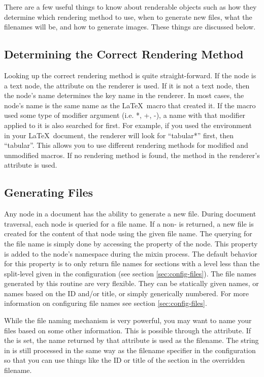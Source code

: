There are a few useful things to know about renderable objects such as
how they determine which rendering method to use, when to generate new
files, what the filenames will be, and how to generate images.  These
things are discussed below.


\subsection{Determining the Correct Rendering Method}

Looking up the correct rendering method is quite straight-forward.
If the node is a text node, the  attribute on
the renderer is used.  If it is not a text node, then the node's name
determines the key name in the renderer.  In most cases, the node's
name is the same name as the \LaTeX\ macro that created it.  If the
macro used some type of modifier argument (i.e. *, +, -), a name
with that modifier applied to it is also searched for first.  For example,
if you used the  environment in your \LaTeX\
document, the renderer will look for ``tabular*'' first, then ``tabular''.
This allows you to use different rendering methods for modified and
unmodified macros.  If no rendering method is found, the method
in the renderer's  attribute is used.


\subsection{Generating Files}

Any node in a document has the ability to generate a new file.
During document traversal, each node is queried for a file name.  If
a non-\var{None} is returned, a new file is created for the content
of that node using the given file name.  The querying for the file name
is simply done by accessing the \member{filename} property of the
node.  This property is added to the node's namespace during the
mixin process.  The default behavior for this property is to only
return file names for sections with a level less than the split-level
given in the configuration (see section \ref{sec:config-files}).
The file names generated by this routine are very flexible.  They can
be statically given names, or names based on the ID and/or title,
or simply generically numbered.  For more information on configuring
file names see section \ref{sec:config-files}.

While the file naming mechanism is very powerful, you may want to name
your files based on some other information.  This is possible through
the  attribute.  If the 
is set, the name returned by that attribute is used as the filename.
The string in \member{filenameoverride} is still processed in the same
way as the filename specifier in the configuration so that you can
use things like the ID or title of the section in the overridden filename.

